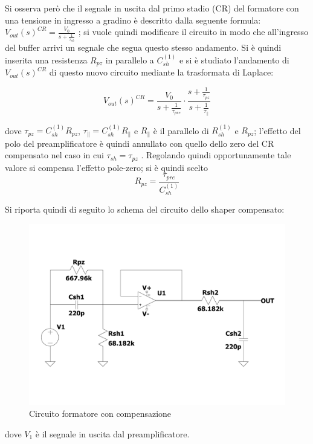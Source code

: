 \documentclass{article}
\begin{document}
Si osserva però che il segnale in uscita dal primo stadio (CR) del formatore con una tensione in ingresso a gradino è descritto dalla seguente formula: 
$V_{out}(s)^{CR}=\frac{V_{0}}{s+\frac{1}{\tau_{sh}}}$
;
si vuole quindi modificare il circuito in modo che all'ingresso del buffer arrivi un segnale che segua questo stesso andamento.
Si è quindi inserita una resistenza $R_{pz}$ in parallelo a $C_{sh}^{(1)}$ e si è studiato l'andamento di $ V_{out}(s)^{CR}$ di questo nuovo circuito mediante la trasformata di Laplace:


\begin{equation}
    V_{out}(s)^{CR}=\frac{V_{0}}{s+\frac{1}{\tau_{pre}}}\cdot \frac{s+\frac{1}{\tau_{pz}}}{s+\frac{1}{\tau_{\parallel}}}
\end{equation}


dove $\tau_{pz}= C_{sh}^{(1)}R_{pz}$, $\tau_{\parallel}= C_{sh}^{(1)}R_{\parallel}$ e $R_{\parallel}$ è il parallelo di $R_{sh}^{(1)}$ e $R_{pz}$;
l’effetto del polo del preamplificatore è quindi annullato con quello dello zero del CR compensato nel caso in cui $\tau_{sh}=\tau_{pz}$ .
Regolando quindi opportunamente tale valore si compensa l'effetto pole-zero;
 si è quindi scelto 
$$R_{pz}= \frac{\tau_{pre}}{C_{sh}^{(1)}}$$



Si riporta quindi di seguito lo schema del circuito dello shaper compensato:
 
\begin{center}
    \begin{figure}[H]
    \centering
    \includegraphics[scale=0.3, angle=0]{shapercomp.pdf}
    \caption{Circuito formatore con compensazione}
    \label{fig:shaper}
    \end{figure}
\end{center}
dove $V_1$ è il segnale in uscita dal preamplificatore.
\end{document}

